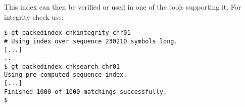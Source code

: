 \documentclass[12pt,titlepage]{article}
\begin{document}
This index can then be verified or used in one of the tools supporting
it. For integrity check use:
\begin{footnotesize}
\begin{verbatim}
$ gt packedindex chkintegrity chr01
# Using index over sequence 230210 symbols long.
[...]
..
$ gt packedindex chksearch chr01
Using pre-computed sequence index.
[...]
Finished 1000 of 1000 matchings successfully.
$
\end{verbatim}
\end{footnotesize}



\end{document}
